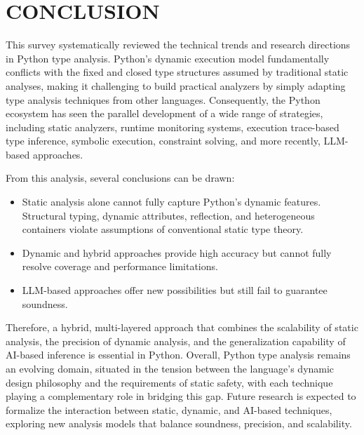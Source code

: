 \section{CONCLUSION}

This survey systematically reviewed the technical trends and research
directions in Python type analysis.
Python’s dynamic execution model fundamentally conflicts with the fixed and
closed type structures assumed by traditional static analyses, making it
challenging to build practical analyzers by simply adapting type analysis
techniques from other languages.
Consequently, the Python ecosystem has seen the parallel development of a wide
range of strategies, including static analyzers, runtime monitoring systems,
execution trace-based type inference, symbolic execution, constraint solving,
and more recently, LLM-based approaches.

From this analysis, several conclusions can be drawn:
\begin{itemize}
  \item Static analysis alone cannot fully capture Python’s dynamic features.
    Structural typing, dynamic attributes, reflection, and heterogeneous
    containers violate assumptions of conventional static type theory.

  \item Dynamic and hybrid approaches provide high accuracy but cannot fully
    resolve coverage and performance limitations.

  \item LLM-based approaches offer new possibilities but still fail to
    guarantee soundness.
\end{itemize}

Therefore, a hybrid, multi-layered approach that combines the scalability of
static analysis, the precision of dynamic analysis, and the generalization
capability of AI-based inference is essential in Python.
Overall, Python type analysis remains an evolving domain, situated in the
tension between the language’s dynamic design philosophy and the requirements
of static safety, with each technique playing a complementary role in bridging
this gap.
Future research is expected to formalize the interaction between static,
dynamic, and AI-based techniques, exploring new analysis models that balance
soundness, precision, and scalability.
